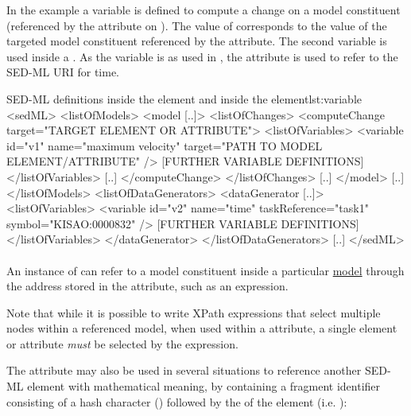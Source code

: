 In the example a variable  is defined to compute a change on a model constituent (referenced by the \hyperref[sec:target]{} attribute on \hyperref[class:computeChange]{}). The value of  corresponds to the value of the targeted model constituent referenced by the  attribute. The second variable  is used inside a \hyperref[class:dataGenerator]{}. As the variable is  as used in , the \hyperref[sec:symbol]{} attribute is used to refer to the SED-ML URI for time.

\begin{myXmlLst}{SED-ML  definitions inside the  element and inside the  element}{lst:variable}
<sedML>
	<listOfModels>
		<model [..]>
			<listOfChanges>
				<computeChange target="TARGET ELEMENT OR ATTRIBUTE">
				<listOfVariables>
				   <variable id="v1" name="maximum velocity" target="PATH TO MODEL ELEMENT/ATTRIBUTE" />
				   [FURTHER VARIABLE DEFINITIONS]
				</listOfVariables>
				[..]
				</computeChange>
			</listOfChanges>
			[..]
		</model>
		[..]
	</listOfModels>
	<listOfDataGenerators>
		<dataGenerator [..]>
			<listOfVariables>
				<variable id="v2" name="time" taskReference="task1" symbol="KISAO:0000832" />
				[FURTHER VARIABLE DEFINITIONS]
			</listOfVariables>
		</dataGenerator>
	</listOfDataGenerators>
	[..]
</sedML>
\end{myXmlLst}


\paragraph*{}
\label{sec:target}
An instance of \Variable can refer to a model constituent inside a particular \hyperref[class:model]{model} through the address stored in the  attribute, such as an  expression.

Note that while it is possible to write XPath expressions that select multiple nodes within a referenced model, when used within a  attribute, a single element or attribute \emph{must} be selected by the expression.

The  attribute may also be used in several situations to reference another SED-ML element with mathematical meaning, by containing a fragment identifier consisting of a hash character (\code{\#}) followed by the \SId of the element (i.e. ):

